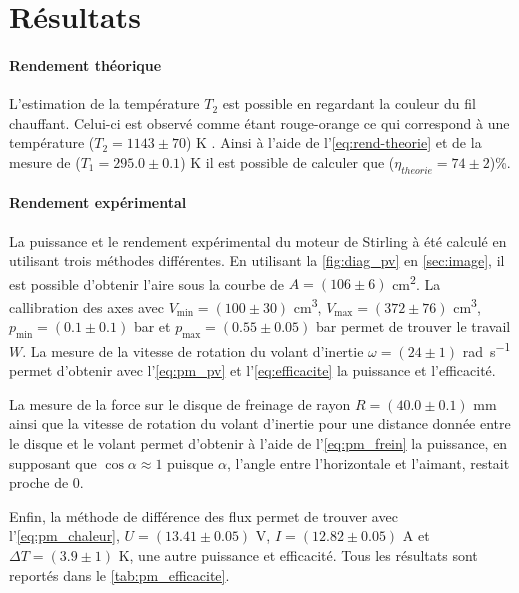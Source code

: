 \section{Résultats}

\paragraph*{Rendement théorique}
L'estimation de la température \(T_2\) est possible en regardant la couleur du fil chauffant. Celui-ci est observé comme étant rouge-orange ce qui correspond à une température (\(T_2 = 1143 \pm 70\)) \si{\kelvin} \cite{temp-fil}. Ainsi à l'aide de l'\autoref{eq:rend-theorie} et de la mesure de (\(T_1 = 295.0 \pm 0.1\)) \si{\kelvin} il est possible de calculer que (\(\eta_{theorie} = 74 \pm2\))\%.

\paragraph*{Rendement expérimental}
La puissance et le rendement expérimental du moteur de Stirling à été calculé en utilisant trois méthodes différentes. En utilisant la \autoref{fig:diag_pv} en \autoref{sec:image}, il est possible d'obtenir l'aire sous la courbe de \(A = (106 \pm 6)\) \si{\centi\meter\squared}. La callibration des axes avec \(V_\textrm{min} = (100 \pm 30)\) \si{\centi\meter\cubed}, \(V_\textrm{max} = (372 \pm 76)\) \si{\centi\meter\cubed}, \(p_\textrm{min} = (0.1 \pm 0.1)\) \si{\bar} et \(p_\textrm{max} = (0.55 \pm 0.05)\) \si{\bar} permet de trouver le travail \(W\). La mesure de la vitesse de rotation du volant d'inertie \(\omega = (24 \pm 1)\) \si{\radian\per\second} permet d'obtenir avec l'\autoref{eq:pm_pv} et l'\autoref{eq:efficacite} la puissance et l'efficacité.

La mesure de la force sur le disque de freinage de rayon \(R = (40.0 \pm 0.1)\) \si{\milli\meter} ainsi que la vitesse de rotation du volant d'inertie pour une distance donnée entre le disque et le volant permet d'obtenir à l'aide de l'\autoref{eq:pm_frein} la puissance, en supposant que \(\cos{\alpha} \approx 1\) puisque \(\alpha\), l'angle entre l'horizontale et l'aimant, restait proche de 0.

Enfin, la méthode de différence des flux permet de trouver avec l'\autoref{eq:pm_chaleur}, \(U = (13.41 \pm 0.05)\) \si{\volt}, \(I = (12.82 \pm 0.05)\) \si{\ampere} et \(\Delta T = (3.9 \pm 1)\) \si{\kelvin}, une autre puissance et efficacité. Tous les résultats sont reportés dans le \autoref{tab:pm_efficacite}.

